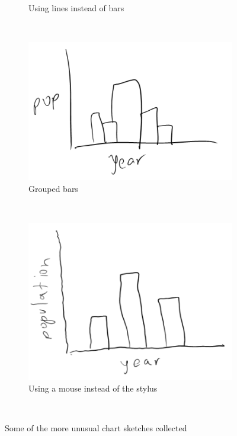 \begin{figure}[h]
\begin{subfigure}[b]{0.5\textwidth}
                \caption{Using lines instead of bars}
                \label{fig:lines}
        \end{subfigure}
        ~ %
          \begin{subfigure}[b]{0.5\textwidth}
                \includegraphics[width=\textwidth]{collection3}
                \caption{Grouped bars}
                \label{fig:grouped}
        \end{subfigure}%
        ~ %
        \begin{subfigure}[b]{0.5\textwidth}
                \includegraphics[width=\textwidth]{collection4}
                \caption{Using a mouse instead of the stylus}
                \label{fig:trembling}
        \end{subfigure}
        ~ %
        \caption{Some of the more unusual chart sketches collected}\label{fig:data_collection_samples}
	\end{figure}
	
